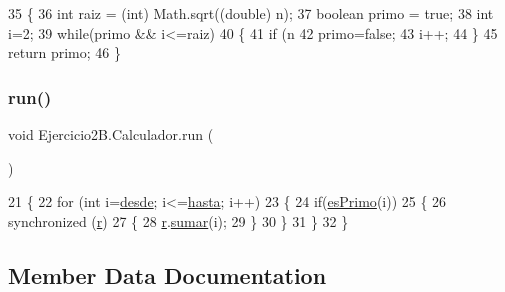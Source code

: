 \begin{DoxyCode}
35     \{
36         \textcolor{keywordtype}{int} raiz = (int) Math.sqrt((\textcolor{keywordtype}{double}) n);
37         \textcolor{keywordtype}{boolean} primo = \textcolor{keyword}{true};
38         \textcolor{keywordtype}{int} i=2;
39         \textcolor{keywordflow}{while}(primo && i<=raiz)
40         \{
41             \textcolor{keywordflow}{if} (n %
42                 primo=\textcolor{keyword}{false};
43             i++;
44         \}
45         \textcolor{keywordflow}{return} primo;
46     \}
\end{DoxyCode}
\mbox{\label{class_ejercicio2_b_1_1_calculador_a8a59ae6dadf8749c2a1c3efd5bddf2d3}} 
\subsubsection{\texorpdfstring{run()}{run()}}
{\footnotesize\ttfamily void Ejercicio2\+B.\+Calculador.\+run (\begin{DoxyParamCaption}{ }\end{DoxyParamCaption})\hspace{0.3cm}{\ttfamily [inline]}}


\begin{DoxyCode}
21     \{
22         \textcolor{keywordflow}{for} (\textcolor{keywordtype}{int} i=\mbox{\hyperlink{class_ejercicio2_b_1_1_calculador_a083a56485cec186e46dbcff1adcecd15}{desde}}; i<=\mbox{\hyperlink{class_ejercicio2_b_1_1_calculador_a84375442ba851669a0ff1db314543783}{hasta}}; i++)
23         \{
24             \textcolor{keywordflow}{if}(\mbox{\hyperlink{class_ejercicio2_b_1_1_calculador_a0ec732ad45b3f85cc7511729b618ef76}{esPrimo}}(i))
25             \{
26                 \textcolor{keyword}{synchronized} (\mbox{\hyperlink{class_ejercicio2_b_1_1_calculador_ad77e58621891d2594748d725f92e92e5}{r}})
27                 \{
28                     \mbox{\hyperlink{class_ejercicio2_b_1_1_calculador_ad77e58621891d2594748d725f92e92e5}{r}}.\mbox{\hyperlink{class_ejercicio2_b_1_1_resultado_ae929ed7dc91fea822e0b9807ac130088}{sumar}}(i);
29                 \}
30             \}
31         \}
32     \}
\end{DoxyCode}


\subsection{Member Data Documentation}
\mbox{\label{class_ejercicio2_b_1_1_calculador_a083a56485cec186e46dbcff1adcecd15}} 
